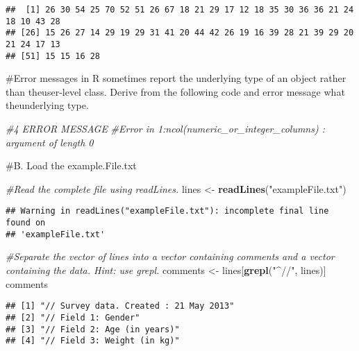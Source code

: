 \documentclass[
]{article}
\newenvironment{Shaded}{\begin{snugshade}}{\end{snugshade}}
\newcommand{\CommentTok}[1]{\textcolor[rgb]{0.56,0.35,0.01}{\textit{#1}}}
\newcommand{\FunctionTok}[1]{\textcolor[rgb]{0.13,0.29,0.53}{\textbf{#1}}}
\newcommand{\NormalTok}[1]{#1}
\newcommand{\OtherTok}[1]{\textcolor[rgb]{0.56,0.35,0.01}{#1}}
\newcommand{\StringTok}[1]{\textcolor[rgb]{0.31,0.60,0.02}{#1}}
\begin{document}
\begin{verbatim}
##  [1] 26 30 54 25 70 52 51 26 67 18 21 29 17 12 18 35 30 36 36 21 24 18 10 43 28
## [26] 15 26 27 14 29 19 29 31 41 20 44 42 26 19 16 39 28 21 39 29 20 21 24 17 13
## [51] 15 15 16 28
\end{verbatim}

\#Error messages in R sometimes report the underlying type of an object
rather than theuser-level class. Derive from the following code and
error message what theunderlying type.

\begin{Shaded}
\begin{Highlighting}[]
\CommentTok{\#4 ERROR MESSAGE}
\CommentTok{\#Error in 1:ncol(numeric\_or\_integer\_columns) : argument of length 0}
\end{Highlighting}
\end{Shaded}

\#B. Load the example.File.txt

\begin{Shaded}
\begin{Highlighting}[]
\CommentTok{\#Read the complete file using readLines.}
\NormalTok{lines }\OtherTok{\textless{}{-}} \FunctionTok{readLines}\NormalTok{(}\StringTok{"exampleFile.txt"}\NormalTok{)}
\end{Highlighting}
\end{Shaded}

\begin{verbatim}
## Warning in readLines("exampleFile.txt"): incomplete final line found on
## 'exampleFile.txt'
\end{verbatim}

\begin{Shaded}
\begin{Highlighting}[]
\CommentTok{\#Separate the vector of lines into a vector containing comments and a vector containing the data. Hint: use grepl.}
\NormalTok{comments }\OtherTok{\textless{}{-}}\NormalTok{ lines[}\FunctionTok{grepl}\NormalTok{(}\StringTok{"\^{}//"}\NormalTok{, lines)]}
\NormalTok{comments}
\end{Highlighting}
\end{Shaded}

\begin{verbatim}
## [1] "// Survey data. Created : 21 May 2013"
## [2] "// Field 1: Gender"                   
## [3] "// Field 2: Age (in years)"           
## [4] "// Field 3: Weight (in kg)"
\end{verbatim}
\end{document}
